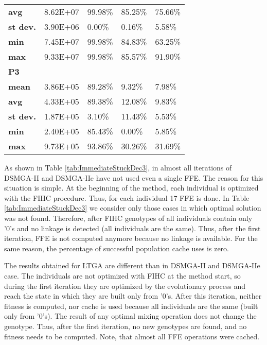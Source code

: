 \begin{table}[]
\begin{tabular}{lllll}
		\textbf{avg}                   & 8.62E+07      & 99.98\%      & 85.25\%                         & 75.66\% \\
		\textbf{st dev.}               & 3.90E+06      & 0.00\%       & 0.16\%                          & 5.58\%  \\
		\textbf{min}                   & 7.45E+07      & 99.98\%      & 84.83\%                         & 63.25\% \\
		\textbf{max}                   & 9.33E+07      & 99.98\%      & 85.57\%                         & 91.90\% \\
		\midrule
		\textbf{P3} & & & & \\
		\textbf{mean}                  & 3.86E+05      & 89.28\%      & 9.32\%                          & 7.98\%  \\
		\textbf{avg}                   & 4.33E+05      & 89.38\%      & 12.08\%                         & 9.83\%  \\
		\textbf{st dev.}               & 1.87E+05      & 3.10\%       & 11.43\%                         & 5.53\%  \\
		\textbf{min}                   & 2.40E+05      & 85.43\%      & 0.00\%                          & 5.85\%  \\
		\textbf{max}                   & 9.73E+05      & 93.86\%      & 30.26\%                         & 31.69\% \\
		\bottomrule
	\end{tabular}
\end{table}



As shown in Table \ref{tab:ImmediateStuckDec3}, in almost all iterations of DSMGA-II and DSMGA-IIe have not used even a single FFE. The reason for this situation is simple. At the beginning of the method, each individual is optimized with the FIHC procedure. Thus, for each individual 17 FFE is done. In Table \ref{tab:ImmediateStuckDec3} we consider only those cases in which optimal solution was not found. Therefore, after FIHC genotypes of all individuals contain only '0's and no linkage is detected (all individuals are the same). Thus, after the first iteration, FFE is not computed anymore because no linkage is available. For the same reason, the percentage of successful population cache uses is zero.\par

The results obtained for LTGA are different than in DSMGA-II and DSMGA-IIe case. The individuals are not optimized with FIHC at the method start, so during the first iteration they are optimized by the evolutionary process and reach the state in which they are built only from '0's. After this iteration, neither fitness is computed, nor cache is used because all individuals are the same (built only from '0's). The result of any optimal mixing operation does not change the genotype. Thus, after the first iteration, no new genotypes are found, and no fitness needs to be computed. Note, that almost all FFE operations were cached.\par


